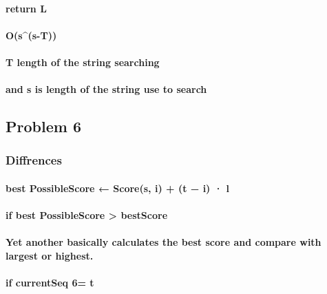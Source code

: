\documentclass[11pt]{article}
\begin{document}
\paragraph{return L}\label{return-l}

\paragraph{O(s\^{}(s-T))}\label{oss-t}

\paragraph{T length of the string
searching}\label{t-length-of-the-string-searching}

\paragraph{and s is length of the string use to
search}\label{and-s-is-length-of-the-string-use-to-search}

    \subsection{Problem 6}\label{problem-6}

    \subsubsection{Diffrences}\label{diffrences}

\paragraph{best PossibleScore ← Score(s, i) + (t − i) ·
l}\label{best-possiblescore-scores-i-t-i-l}

\paragraph{if best PossibleScore \textgreater{}
bestScore}\label{if-best-possiblescore-bestscore}

\paragraph{Yet another basically calculates the best score and compare
with largest or
highest.}\label{yet-another-basically-calculates-the-best-score-and-compare-with-largest-or-highest.}

\paragraph{if currentSeq 6= t}\label{if-currentseq-6-t}
\end{document}
